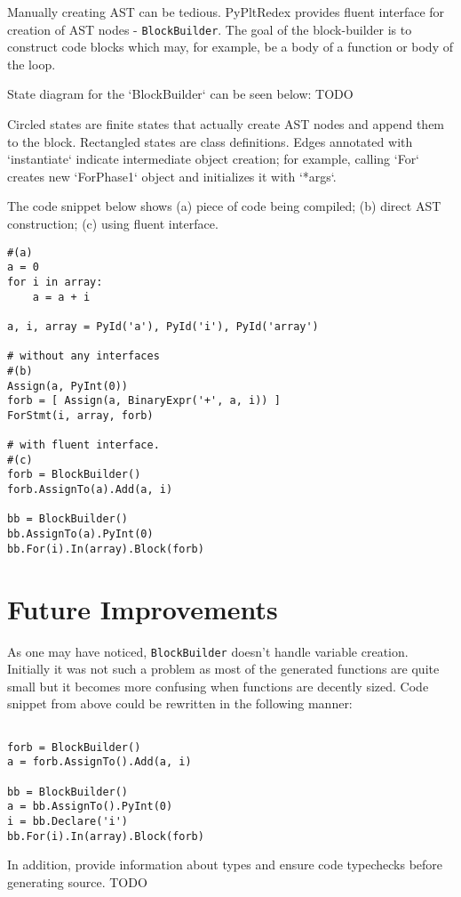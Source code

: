 Manually creating AST can be tedious. PyPltRedex provides fluent interface for creation of AST nodes - \texttt{BlockBuilder}. The goal of the block-builder is to construct code blocks which may, for example, be a body of a function or body of the loop. 

State diagram for the `BlockBuilder` can be seen below:
TODO

Circled states are finite states that actually create AST nodes and append them to the block. Rectangled states are class definitions. Edges annotated with `instantiate` indicate intermediate object creation; for example, calling `For` creates new `ForPhase1` object and initializes it with `*args`. 

The code snippet below shows (a) piece of code being compiled; (b) direct AST construction; (c) using fluent interface.

\begin{lstlisting}[caption=oh no!]
#(a)
a = 0
for i in array:
	a = a + i

a, i, array = PyId('a'), PyId('i'), PyId('array')

# without any interfaces
#(b)
Assign(a, PyInt(0))
forb = [ Assign(a, BinaryExpr('+', a, i)) ]
ForStmt(i, array, forb)

# with fluent interface.
#(c)
forb = BlockBuilder()
forb.AssignTo(a).Add(a, i)

bb = BlockBuilder()
bb.AssignTo(a).PyInt(0)
bb.For(i).In(array).Block(forb)
\end{lstlisting}


\section{Future Improvements}

As one may have noticed, \texttt{BlockBuilder} doesn't handle variable creation. Initially it was not such a problem as most of the generated functions are quite small but it becomes more confusing when functions are decently sized. Code snippet from above could be rewritten in the following manner:

\begin{lstlisting}[caption=Oh yes!]

forb = BlockBuilder()
a = forb.AssignTo().Add(a, i)

bb = BlockBuilder()
a = bb.AssignTo().PyInt(0)
i = bb.Declare('i')
bb.For(i).In(array).Block(forb)
\end{lstlisting}

 In addition, provide information about types and ensure code typechecks before generating source. TODO
